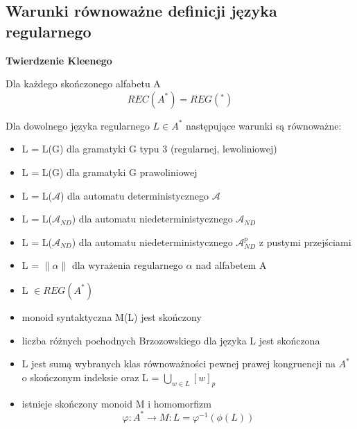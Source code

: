 \documentclass[12pt]{article}
\begin{document}
    \subsection{Warunki równoważne definicji języka regularnego}
    \begin{theorem}
        \textbf{Twierdzenie Kleenego}

        Dla każdego skończonego alfabetu A
        $$REC(A^*) = REG(^*)$$
    \end{theorem}

    \begin{theorem}
        Dla dowolnego języka regularnego $L \in A^*$ następujące warunki są równoważne:
        \begin{itemize}
            \item L = L(G) dla gramatyki G typu 3 (regularnej, lewoliniowej)
            \item L = L(G) dla gramatyki G prawoliniowej
            \item L = L($\mathcal{A}$) dla automatu deterministycznego $\mathcal{A}$
            \item L = L($\mathcal{A}_{ND}$) dla automatu niedeterministycznego $\mathcal{A}_{ND}$
            \item L = L($\mathcal{A}_{ND}$) dla automatu niedeterministycznego $\mathcal{A}_{ND}^p$ z pustymi przejściami

            \item L = $\|\alpha\|$ dla wyrażenia regularnego $\alpha$ nad alfabetem A
            \item L $\in REG(A^*)$
            \item monoid syntaktyczna M(L) jest skończony
            \item liczba różnych pochodnych Brzozowskiego dla języka
            L jest skończona
            \item L jest sumą wybranych klas równoważności pewnej prawej kongruencji na $A^*$
            o skończonym indeksie oraz L = $\bigcup\limits_{w \in L}[w]_p$
            \item istnieje skończony monoid M i homomorfizm
            $$\varphi : A^* \rightarrow M : L = \varphi^{-1}(\phi(L))$$
        \end{itemize}
    \end{theorem}

    \newpage
\end{document}
